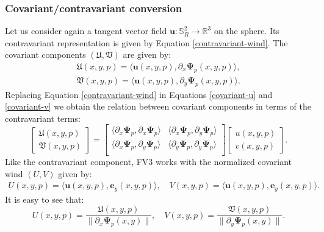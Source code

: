 \subsubsection{Covariant/contravariant conversion}
\label{anexo-cov-con}
Let us consider again a tangent vector field $\boldsymbol{u}: \mathbb{S}^2_R \to 
\mathbb{R}^3$ on the sphere. Its contravariant representation 
is given by Equation \eqref{contravariant-wind}.
The covariant components $(\mathfrak{U},\mathfrak{V})$ are given by:
\begin{align}
	\label{covariant-u}
	\mathfrak{U}(x,y,p) = \langle \boldsymbol{u}(x,y,p) , 	\partial_x\boldsymbol{\Psi}_p(x,y,p)  \rangle, \\
	\label{covariant-v}
	\mathfrak{V}(x,y,p) = \langle \boldsymbol{u}(x,y,p) , 	\partial_y\boldsymbol{\Psi}_p(x,y,p)  \rangle.
\end{align}
Replacing Equation \eqref{contravariant-wind} in 
Equations \eqref{covariant-u} and \eqref{covariant-v} we obtain
the relation between covariant components in terms of the
contravariant terms:
\begin{equation}
	\label{contravariant-to-covariant}
	\begin{bmatrix}
		\mathfrak{U}(x,y,p) \\
		\mathfrak{V}(x,y,p)
	\end{bmatrix}
	=
	\begin{bmatrix}
		\langle 	\partial_x\boldsymbol{\Psi}_p, \partial_x\boldsymbol{\Psi}_p \rangle
		& \langle 	\partial_x\boldsymbol{\Psi}_p, \partial_y\boldsymbol{\Psi}_p \rangle \\
		\langle 	\partial_x\boldsymbol{\Psi}_p, \partial_y\boldsymbol{\Psi}_p \rangle 
		& \langle   \partial_y\boldsymbol{\Psi}_p, \partial_y\boldsymbol{\Psi}_p \rangle \\
	\end{bmatrix}
	\begin{bmatrix}
		{u} (x,y,p) \\
		{v} (x,y,p) 
	\end{bmatrix}.
\end{equation}
Like the contravariant component, FV3 works with the normalized covariant wind $({U},{V})$ given by:
\begin{align}
	\label{norm-covariant-u}
	{U}(x,y,p) = \langle \boldsymbol{u}(x,y,p) , \boldsymbol{e}_y(x,y,p)  \rangle, \quad
	{V}(x,y,p) = \langle \boldsymbol{u}(x,y,p) , \boldsymbol{e}_y(x,y,p)  \rangle.
\end{align}
It is easy to see that:
\begin{equation}
	\label{covari-uv}
	{U}(x,y,p)  = \frac{\mathfrak{U}(x,y,p)}{\|\partial_x\boldsymbol{\Psi}_p(x,y)\|}, \quad
	{V}(x,y,p)  = \frac{\mathfrak{V}(x,y,p)}{\|\partial_y\boldsymbol{\Psi}_p(x,y)\|}.
\end{equation}
